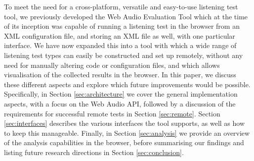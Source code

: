 \documentclass{sig-alternate}
\begin{document}

    To meet the need for a cross-platform, versatile and easy-to-use listening test tool, we previously developed the Web Audio Evaluation Tool \cite{waet} which at the time of its inception was capable of running a listening test in the browser from an XML configuration file, and storing an XML file as well, with one particular interface. We have now expanded this into a tool with which a wide range of listening test types can easily be constructed and set up remotely, without any need for manually altering code or configuration files, and which allows visualisation of the collected results in the browser. In this paper, we discuss these different aspects and explore which future improvements would be possible. Specifically, in Section \ref{sec:architecture} we cover the general implementation aspects, with a focus on the Web Audio API, followed by a discussion of the requirements for successful remote tests in Section \ref{sec:remote}. Section \ref{sec:interfaces} describes the various interfaces the tool supports, as well as how to keep this manageable. Finally, in Section \ref{sec:analysis} we provide an overview of the analysis capabilities in the browser, before summarising our findings and listing future research directions in Section \ref{sec:conclusion}.
\end{document}
